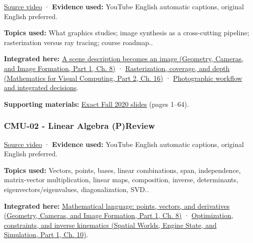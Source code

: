 \hypertarget{04-visual-computing-ii-ch036-cmu-01---course-overview}{}

\href{https://www.youtube.com/watch?v=PhxV_JrXeVk}{Source video} · \textbf{Evidence used:} YouTube English automatic captions, original English preferred.

\textbf{Topics used:} What graphics studies; image synthesis as a cross-cutting pipeline; rasterization versus ray tracing; course roadmap..

\textbf{Integrated here:} \href{../03-Geometry-Cameras-and-Image-Formation-P01/main.pdf\#03-visual-computing-i-ch001-a-scene-description-becomes-an-image}{A scene description becomes an image (Geometry, Cameras, and Image Formation, Part 1, Ch. 8)} · \href{../02-Mathematics-for-Visual-Computing-P02/main.pdf\#03-visual-computing-i-ch012-rasterization-coverage-and-depth}{Rasterization, coverage, and depth (Mathematics for Visual Computing, Part 2, Ch. 16)} · \hyperref[04-visual-computing-ii-ch034-photographic-workflow-and-integrated-decisions]{Photographic workflow and integrated decisions}.

\textbf{Supporting materials:} \href{https://15462.courses.cs.cmu.edu/fall2020content/lectures/01_intro/01_intro_slides.pdf}{Exact Fall 2020 slides} (pages 1--64).

\subsubsection{CMU-02 - Linear Algebra (P)Review}\label{04-visual-computing-ii-ch036-cmu-02---linear-algebra-preview}

\hypertarget{04-visual-computing-ii-ch036-cmu-02---linear-algebra-preview}{}

\href{https://www.youtube.com/watch?v=2c8XQlQApx8}{Source video} · \textbf{Evidence used:} YouTube English automatic captions, original English preferred.

\textbf{Topics used:} Vectors, points, bases, linear combinations, span, independence, matrix-vector multiplication, linear maps, composition, inverse, determinants, eigenvectors/eigenvalues, diagonalization, SVD..

\textbf{Integrated here:} \href{../03-Geometry-Cameras-and-Image-Formation-P01/main.pdf\#03-visual-computing-i-ch001-mathematical-language-points-vectors-and-derivatives}{Mathematical language: points, vectors, and derivatives (Geometry, Cameras, and Image Formation, Part 1, Ch. 8)} · \href{../05-Spatial-Worlds-Engine-State-and-Simulation-P01/main.pdf\#04-visual-computing-ii-ch029-optimization-constraints-and-inverse-kinematics}{Optimization, constraints, and inverse kinematics (Spatial Worlds, Engine State, and Simulation, Part 1, Ch. 10)}.


